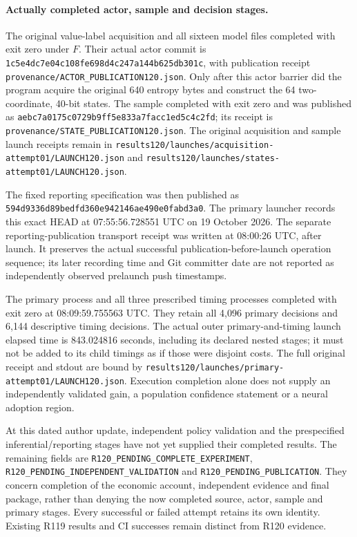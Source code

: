 \paragraph{Actually completed actor, sample and decision stages.}
The original value-label acquisition and all sixteen model files completed
with exit zero under $F$. Their actual actor commit is
\nolinkurl{1c5e4dc7e04c108fe698d4c247a144b625db301c},
with publication receipt
\nolinkurl{provenance/ACTOR_PUBLICATION120.json}.
Only after this actor barrier did the program acquire the original
640 entropy bytes and construct the 64 two-coordinate, 40-bit states.
The sample completed with exit zero and was published as
\nolinkurl{aebc7a0175c0729b9ff5e833a7facc1ed5c4c2fd}; its receipt is
\nolinkurl{provenance/STATE_PUBLICATION120.json}.
The original acquisition and sample launch receipts remain in
\nolinkurl{results120/launches/acquisition-attempt01/LAUNCH120.json} and
\nolinkurl{results120/launches/states-attempt01/LAUNCH120.json}.

The fixed reporting specification was then published as
\nolinkurl{594d9336d89bedfd360e942146ae490e0fabd3a0}.
The primary launcher records this exact HEAD at 07:55:56.728551 UTC
on 19 October 2026. The separate reporting-publication transport receipt
was written at 08:00:26 UTC, after launch. It preserves the actual
successful publication-before-launch operation sequence; its later
recording time and Git committer date are not reported as independently
observed prelaunch push timestamps.

The primary process and all three prescribed timing processes completed
with exit zero at 08:09:59.755563 UTC. They retain all 4,096 primary
decisions and 6,144 descriptive timing decisions. The actual outer
primary-and-timing launch elapsed time is 843.024816 seconds, including
its declared nested stages; it must not be added to its child timings
as if those were disjoint costs. The full original receipt and stdout
are bound by
\nolinkurl{results120/launches/primary-attempt01/LAUNCH120.json}.
Execution completion alone does not supply an independently validated
gain, a population confidence statement or a neural adoption region.

At this dated author update, independent policy validation and the
prespecified inferential/reporting stages have not yet supplied their
completed results. The remaining fields are
\nolinkurl{R120_PENDING_COMPLETE_EXPERIMENT},
\nolinkurl{R120_PENDING_INDEPENDENT_VALIDATION} and
\nolinkurl{R120_PENDING_PUBLICATION}. They concern completion of the
economic account, independent evidence and final package, rather than
denying the now completed source, actor, sample and primary stages.
Every successful or failed attempt retains its own identity. Existing
R119 results and CI successes remain distinct from R120 evidence.

